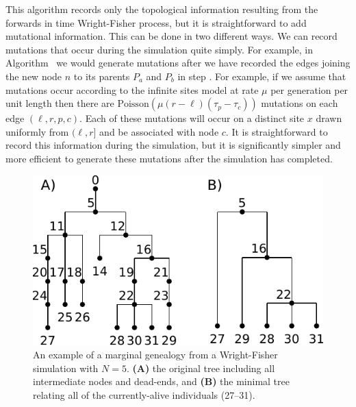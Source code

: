 \documentclass{article}
\begin{document}
This algorithm records only the topological information resulting from the
forwards in time Wright-Fisher process, but it is straightforward to add
mutational information. This can be done in two different ways.
We can record mutations that occur during the simulation quite simply.
For example, in Algorithm~ we would generate mutations after
we have recorded the edges joining the new node $n$ to its parents
$P_a$ and $P_b$ in step .
For example, if we assume that mutations occur according to the infinite sites model
at rate $\mu$ per generation per unit length then there are 
$\mbox{Poisson}\left(\mu (r - \ell)(\tau_p
- \tau_c)\right)$ mutations on each edge $(\ell, r, p, c)$. Each of these mutations
will occur on a distinct site $x$ drawn uniformly from $(\ell, r]$ and be associated with node $c$.
It is straightforward to record this information during the simulation, but it
is significantly simpler and more efficient to generate these mutations
after the simulation has completed. 

\begin{figure}
    \begin{center}
        \includegraphics{wf-before-after}
    \end{center}
    \caption{An example of a marginal genealogy from a Wright-Fisher simulation
    with $N=5$. \textbf{(A)} the original tree including all
    intermediate nodes and dead-ends, and \textbf{(B)} the minimal tree
    relating all of the currently-alive individuals (27--31).
    \label{fig:wf-trees}
    }
\end{figure}
\end{document}

